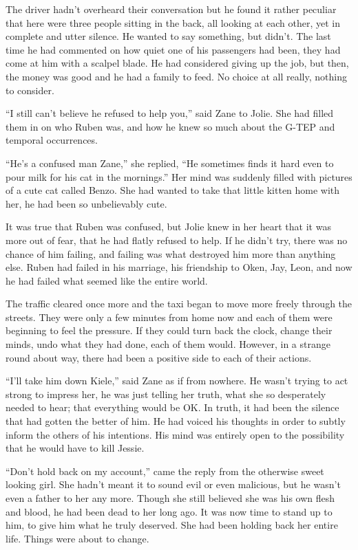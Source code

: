 The driver hadn't overheard their conversation but he found it rather peculiar that here were three people sitting in the back, all looking at each other, yet in complete and utter silence.  He wanted to say something, but didn't.  The last time he had commented on how quiet one of his passengers had been, they had come at him with a scalpel blade.  He had considered giving up the job, but then, the money was good and he had a family to feed.  No choice at all really, nothing to consider.

``I still can't believe he refused to help you,'' said Zane to Jolie.  She had filled them in on who Ruben was, and how he knew so much about the G-TEP and temporal occurrences.

``He's a confused man Zane,'' she replied, ``He sometimes finds it hard even to pour milk for his cat in the mornings.''  Her mind was suddenly filled with pictures of a cute cat called Benzo.  She had wanted to take that little kitten home with her, he had been so unbelievably cute.  

It was true that Ruben was confused, but Jolie knew in her heart that it was more out of fear, that he had flatly refused to help.  If he didn't try, there was no chance of him failing, and failing was what destroyed him more than anything else.  Ruben had failed in his marriage, his friendship to Oken, Jay, Leon, and now he had failed what seemed like the entire world.  

The traffic cleared once more and the taxi began to move more freely through the streets.  They were only a few minutes from home now and each of them were beginning to feel the pressure.  If they could turn back the clock, change their minds, undo what they had done, each of them would.  However, in a strange round about way, there had been a positive side to each of their actions.

``I'll take him down Kiele,'' said Zane as if from nowhere.  He wasn't trying to act strong to impress her, he was just telling her truth, what she so desperately needed to hear; that everything would be OK.  In truth, it had been the silence that had gotten the better of him.  He had voiced his thoughts in order to subtly inform the others of his intentions.  His mind was entirely open to the possibility that he would have to kill Jessie.

``Don't hold back on my account,'' came the reply from the otherwise sweet looking girl.  She hadn't meant it to sound evil or even malicious, but he wasn't even a father to her any more.  Though she still believed she was his own flesh and blood, he had been dead to her long ago.  It was now time to stand up to him, to give him what he truly deserved.  She had been holding back her entire life.  Things were about to change.

